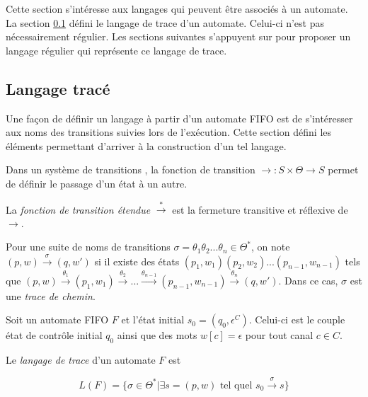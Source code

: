 Cette section s'intéresse aux langages qui peuvent être associés à un automate. La section \ref{ss:trace} défini le langage de trace d'un automate. Celui-ci n'est pas nécessairement régulier. Les sections suivantes s'appuyent sur \cite{Vardhan04} pour proposer un langage régulier qui représente ce langage de trace.



\subsection{Langage tracé}\label{ss:trace}

Une façon de définir un langage à partir d'un automate FIFO est de s'intéresser aux noms des transitions suivies lors de l'exécution. Cette section défini les éléments permettant d'arriver à la construction d'un tel langage.

Dans un système de transitions \tsys, la fonction de transition $\rightarrow:S\times\Theta\rightarrow S$ permet de définir le passage d'un état à un autre.

La \emph{fonction de transition étendue} $\xrightarrow{*}$ est la fermeture transitive et réflexive de $\rightarrow$.

Pour une suite de noms de transitions $\sigma=\theta_1\theta_2 ...\theta_n\in\Theta^*$, on note $(p,w)\xrightarrow{\sigma}(q,w')$ si il existe des états $(p_1,w_1)(p_2,w_2)...(p_{n-1},w_{n-1})$ tels que $(p,w)\xrightarrow{\theta_1}(p_1,w_1)\xrightarrow{\theta_2}...\xrightarrow{\theta_{n-1}}(p_{n-1},w_{n-1})\xrightarrow{\theta_n}(q,w')$. Dans ce cas, $\sigma$ est une \emph{trace de chemin}.

\begin{definition} Soit un automate FIFO $F$ et l'état initial $s_0=(q_0, \epsilon^C)$. Celui-ci est le couple état de contrôle initial $q_0$ ainsi que des mots $w[c]=\epsilon$ pour tout canal $c\in C$.

  Le \emph{langage de trace} d'un automate $F$ est

  $$
  L(F)=\{\sigma\in\Theta^*|\exists s=(p,w) \text{ tel quel } s_0\xrightarrow{\sigma}s\}
  $$
\end{definition}

